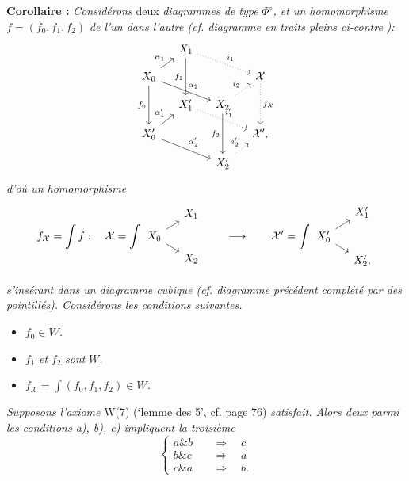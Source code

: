 \documentclass[11pt]{article}
\newcommand{\printedpage}[1]{\marginpar{\footnotesize p.~#1}}
\newcommand{\msp}[1]{\marginpar{\footnotesize [#1]}}
\newcommand{\cX}{\mathcal{X}}
\begin{document}
\textbf{Corollaire :} \textit{Considérons} deux \textit{diagrammes de type} $\Phi^{\circ}$\textit{, et un homomorphisme} $f = (f_0, f_1, f_2)$ \textit{de l'un dans l'autre (cf. diagramme en traits pleins ci-contre} \textit{):}
\[
\begin{tikzcd}[column sep=small, row sep=small, ampersand replacement=\&]
 \& X_1 \arrow[dd, "f_1"'] \arrow[drr, dotted, "i_1"] \& \& \\
X_0 \arrow[ur, "\alpha_1"] \arrow[drr, "\alpha_2"] \arrow[dd, "f_0"'] \& \& \& \cX \arrow[dd, dotted, "f_{\cX}"] \\
 \& X'_1 \arrow[drr, dotted, "i'_1"] \& X_2 \arrow[ur, dotted, "i_2"] \arrow[dd, "f_2"'] \& \\
X'_0 \arrow[ur, "\alpha'_1"] \arrow[drr, "\alpha'_2"] \& \& \& \cX', \\
 \& \& X'_2 \arrow[ur, dotted, "i'_2"] \&
\end{tikzcd}
\]
\textit{d'où un homomorphisme}
\msp{page 127}
\[
f_{\cX} = \int f : \quad \cX = \int
\begin{tikzcd}[column sep=small, row sep=tiny, ampersand replacement=\&, baseline=(\tikzcdmatrixname-2-1.base)]
 \& X_1 \\
X_0 \arrow[ur] \arrow[dr] \& \\
 \& X_2
\end{tikzcd}
\qquad\longrightarrow\qquad
\cX' = \int
\begin{tikzcd}[column sep=small, row sep=tiny, ampersand replacement=\&, baseline=(\tikzcdmatrixname-2-1.base)]
 \& X'_1 \\
X'_0 \arrow[ur] \arrow[dr] \& \\
 \& X'_2,
\end{tikzcd}
\]

\printedpage{86}
\textit{s'insérant dans un diagramme cubique (cf. diagramme précédent complété par des pointillés). Considérons les conditions suivantes.}

\begin{itemize}
\item[\textit{a)}] $f_0\in W$\textit{.}
\item[\textit{b)}] $f_1$ \textit{et} $f_2$ \textit{sont} $W$\textit{.}
\item[\textit{c)}] $f_{\cX} = \int(f_0, f_1, f_2)\in W$\textit{.}
\end{itemize}

\textit{Supposons l'axiome} W(7) (`lemme des 5', cf. page 76) \textit{satisfait. Alors deux parmi les conditions a), b), c) impliquent la troisième}
\[
\left\{
\begin{aligned}
a \mathbin{\&} b &\quad\Longrightarrow\quad c\\
b \mathbin{\&} c &\quad\Longrightarrow\quad a\\
c \mathbin{\&} a &\quad\Longrightarrow\quad b.
\end{aligned}
\right.
\]
\end{document}
